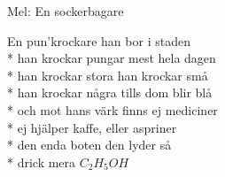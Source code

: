 \begin{SongText}
    \begin{SongInfo}
        Mel: En sockerbagare
    \end{SongInfo}
    \begin{SongVerse}
        En pun’krockare han bor i staden\\*%
        han krockar pungar mest hela dagen\\*%
        han krockar stora han krockar små\\*%
        han krockar några tills dom blir blå\\*%
        och mot hans värk finns ej mediciner\\*%
        ej hjälper kaffe, eller aspriner\\*%
        den enda boten den lyder så\\*%
        drick mera $C_2H_5OH$
    \end{SongVerse}
\end{SongText}
